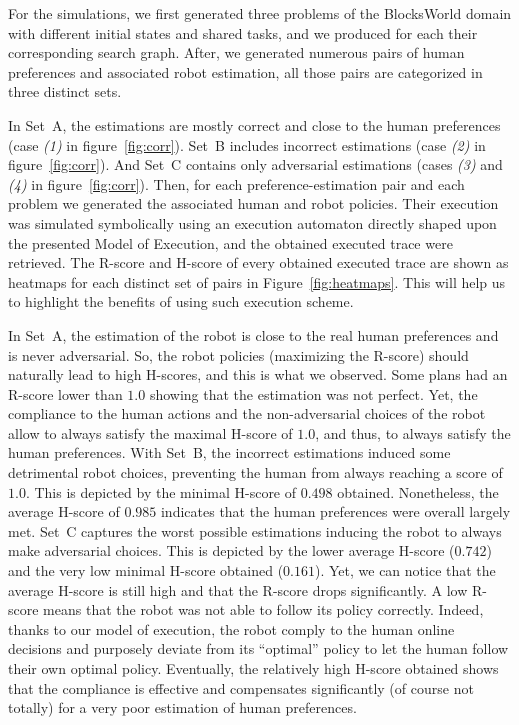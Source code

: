 For the simulations, we first generated three problems of the BlocksWorld domain with different initial states and shared tasks, and we produced for each their corresponding search graph. 
After, we generated numerous pairs of human preferences and associated robot estimation, all those pairs are categorized in three distinct sets.

In Set~A, the estimations are mostly correct and close to the human preferences (case \textit{(1)} in figure~\ref{fig:corr}). Set~B includes incorrect estimations (case \textit{(2)} in figure~\ref{fig:corr}). And Set~C contains only adversarial estimations (cases \textit{(3)} and \textit{(4)} in figure~\ref{fig:corr}).
Then, for each preference-estimation pair and each problem we generated the associated human and robot policies. Their execution was simulated symbolically using an execution automaton directly shaped upon the presented Model of Execution, and the obtained executed trace were retrieved.
The R-score and H-score of every obtained executed trace are shown as heatmaps for each distinct set of pairs in Figure~\ref{fig:heatmaps}. This will help us to highlight the benefits of using such execution scheme.

In Set~A, the estimation of the robot is close to the real human preferences and is never adversarial. So, the robot policies (maximizing the R-score) should naturally lead to high H-scores, and this is what we observed.
Some plans had an R-score lower than $1.0$ showing that the estimation was not perfect. Yet, the compliance to the human actions and the non-adversarial choices of the robot allow to always satisfy the maximal H-score of $1.0$, and thus, to always satisfy the human preferences. 
With Set~B, the incorrect estimations induced some detrimental robot choices, preventing the human from always reaching a score of $1.0$. This is depicted by the minimal H-score of $0.498$ obtained. Nonetheless, the average H-score of $0.985$ indicates that the human preferences were overall largely met.
Set~C captures the worst possible estimations inducing the robot to always make adversarial choices. This is depicted by the lower average H-score ($0.742$) and the very low minimal H-score obtained ($0.161$). 
Yet, we can notice that the average H-score is still high and that the R-score drops significantly. A low R-score means that the robot was not able to follow its policy correctly. Indeed, thanks to our model of execution, the robot comply to the human online decisions and purposely deviate from its ``optimal'' policy to let the human follow their own optimal policy. Eventually, the relatively high H-score obtained shows that the compliance is effective and compensates significantly (of course not totally) for a very poor estimation of human preferences. 

